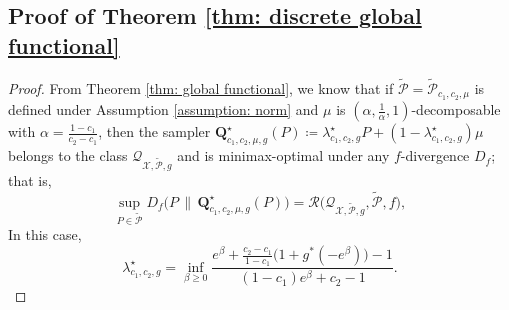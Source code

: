 \documentclass[accepted]{article}
\theoremstyle{plain} %
\theoremstyle{definition}
\theoremstyle{remark}
\newcommand{\bQ}{\mathbf{Q}}
\begin{document}
\subsection{Proof of Theorem \ref{thm: discrete global functional}}
\begin{proof}
    From Theorem \ref{thm: global functional}, we know that if $\tilde{\mathcal{P}} = \tilde{\mathcal{P}}_{c_1, c_2, \mu}$ is defined under Assumption \ref{assumption: norm} and  $\mu$ is $(\alpha,\frac{1}{\alpha},1)$-decomposable with $\alpha = \frac{1 - c_1}{c_2 - c_1}$, then the sampler
    $\bQ^\star_{c_1,c_2,\mu,g}(P) \coloneqq \lambda^\star_{c_1,c_2,g} P + (1 - \lambda^\star_{c_1,c_2,g})\mu$
    belongs to the class $\mathcal{Q}_{\mathcal{X}, \tilde{\mathcal{P}}, g}$ and is minimax-optimal under any $f$-divergence $D_f$; that is,
    \begin{equation*}
        \sup_{P \in \tilde{\mathcal{P}}} D_f\big(P \, \| \, \bQ^\star_{c_1,c_2,\mu,g}(P)\big)
        = \mathcal{R}\big(\mathcal{Q}_{\mathcal{X}, \tilde{\mathcal{P}}, g}, \tilde{\mathcal{P}}, f\big),
    \end{equation*}
In this case, 
    \[
    \lambda^\star_{c_1,c_2,g} 
    = \inf_{\beta \geq 0} 
    \frac{e^\beta + \frac{c_2 - c_1}{1 - c_1} \big( 1 + g^*(-e^\beta) \big) - 1}
         {(1 - c_1)e^\beta + c_2 - 1}.
    \]



\end{proof}
\end{document}
